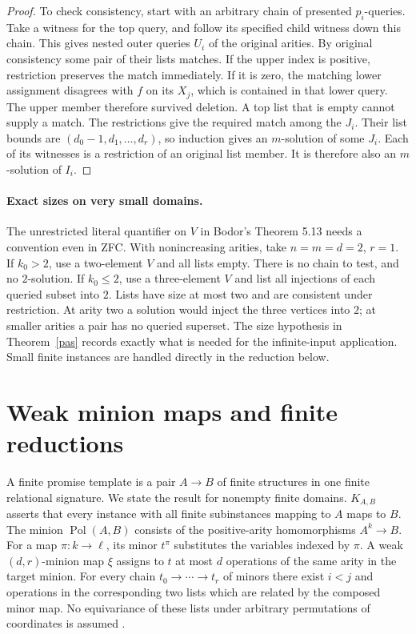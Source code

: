 \documentclass[11pt]{article}
\newcommand{\Pol}{\operatorname{Pol}}
\begin{document}
\begin{proof}
To check consistency, start with an arbitrary chain of presented $p_i$-queries. Take a witness for the top query, and follow its specified child witness down this chain. This gives nested outer queries $U_i$ of the original arities. By original consistency some pair of their lists matches. If the upper index is positive, restriction preserves the match immediately. If it is zero, the matching lower assignment disagrees with $f$ on its $X_j$, which is contained in that lower query. The upper member therefore survived deletion. A top list that is empty cannot supply a match. The restrictions give the required match among the $J_i$. Their list bounds are $(d_0-1,d_1,\ldots,d_r)$, so induction gives an $m$-solution of some $J_i$. Each of its witnesses is a restriction of an original list member. It is therefore also an $m$-solution of $I_i$.
\end{proof}

\paragraph{Exact sizes on very small domains.}
The unrestricted literal quantifier on $V$ in Bodor's Theorem 5.13 needs a convention even in ZFC. With nonincreasing arities, take $n=m=d=2$, $r=1$. If $k_0>2$, use a two-element $V$ and all lists empty. There is no chain to test, and no $2$-solution. If $k_0\leq2$, use a three-element $V$ and list all injections of each queried subset into $2$. Lists have size at most two and are consistent under restriction. At arity two a solution would inject the three vertices into $2$; at smaller arities a pair has no queried superset. The size hypothesis in Theorem~\ref{pas} records exactly what is needed for the infinite-input application. Small finite instances are handled directly in the reduction below.

\section{Weak minion maps and finite reductions}
A finite promise template is a pair $A\to B$ of finite structures in one finite relational signature. We state the result for nonempty finite domains. $K_{A,B}$ asserts that every instance with all finite subinstances mapping to $A$ maps to $B$. The minion $\Pol(A,B)$ consists of the positive-arity homomorphisms $A^k\to B$. For a map $\pi:k\to\ell$, its minor $t^\pi$ substitutes the variables indexed by $\pi$. A weak $(d,r)$-minion map $\xi$ assigns to $t$ at most $d$ operations of the same arity in the target minion. For every chain $t_0\to\cdots\to t_r$ of minors there exist $i<j$ and operations in the corresponding two lists which are related by the composed minor map. No equivariance of these lists under arbitrary permutations of coordinates is assumed \cite[Definition 5.2]{bodor}.
\end{document}
